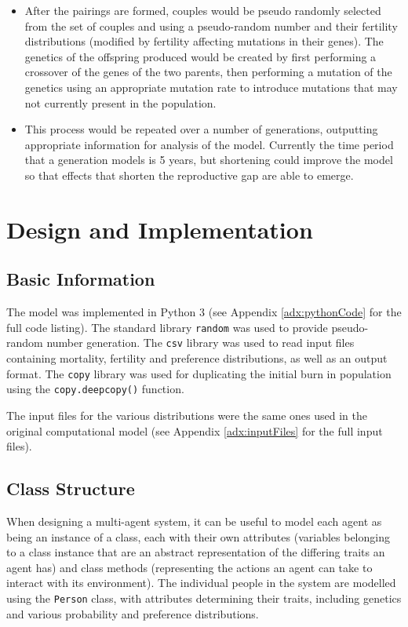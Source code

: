 \documentclass[authoryearcitations]{UoYCSproject}
\begin{document}
\begin{itemize}
\item After the pairings are formed, couples would be pseudo randomly selected from the set of couples and using a pseudo-random number and their fertility distributions (modified by fertility affecting mutations in their genes). The genetics of the offspring produced would be created by first performing a crossover of the genes of the two parents, then performing a mutation of the genetics using an appropriate mutation rate to introduce mutations that may not currently present in the population.

\item This process would be repeated over a number of generations, outputting appropriate information for analysis of the model. Currently the time period that a generation models is 5 years, but shortening could improve the model so that effects that shorten the reproductive gap are able to emerge.

\end{itemize}

\chapter{Design and Implementation}
\label{cha:Design and Implementation}
\section{Basic Information}
The model was implemented in Python 3 (see Appendix \ref{adx:pythonCode} for the full code listing). The standard library \texttt{random} was used to provide pseudo-random number generation. The \texttt{csv} library was used to read input files containing mortality, fertility and preference distributions, as well as an output format. The \texttt{copy} library was used for duplicating the initial burn in population using the \texttt{copy.deepcopy()} function.

The input files for the various distributions were the same ones used in the original computational model \cite{mateChoice2013} (see Appendix \ref{adx:inputFiles} for the full input files).

\section{Class Structure}
When designing a multi-agent system, it can be useful to model each agent as being an instance of a class, each with their own attributes (variables belonging to a class instance that are an abstract representation of the differing traits an agent has) and class methods (representing the actions an agent can take to interact with its environment). The individual people in the system are modelled using the \texttt{Person} class, with attributes determining their traits, including genetics and various probability and preference distributions. 
\end{document}
